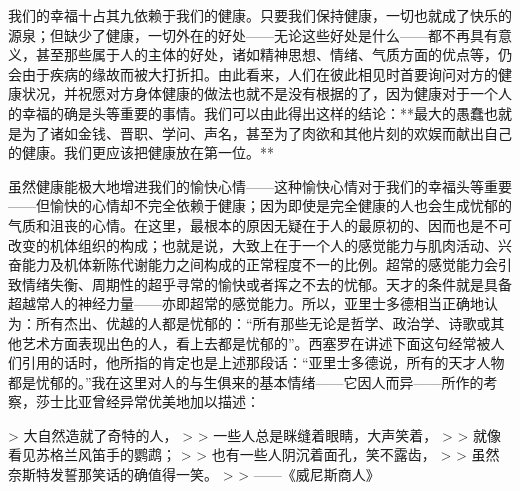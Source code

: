 \documentclass[12pt,oneside]{book}
\begin{document}
我们的幸福十占其九依赖于我们的健康。只要我们保持健康，一切也就成了快乐的源泉；但缺少了健康，一切外在的好处——无论这些好处是什么——都不再具有意义，甚至那些属于人的主体的好处，诸如精神思想、情绪、气质方面的优点等，仍会由于疾病的缘故而被大打折扣。由此看来，人们在彼此相见时首要询问对方的健康状况，并祝愿对方身体健康的做法也就不是没有根据的了，因为健康对于一个人的幸福的确是头等重要的事情。我们可以由此得出这样的结论：**最大的愚蠢也就是为了诸如金钱、晋职、学问、声名，甚至为了肉欲和其他片刻的欢娱而献出自己的健康。我们更应该把健康放在第一位。** 

虽然健康能极大地增进我们的愉快心情——这种愉快心情对于我们的幸福头等重要——但愉快的心情却不完全依赖于健康；因为即使是完全健康的人也会生成忧郁的气质和沮丧的心情。在这里，最根本的原因无疑在于人的最原初的、因而也是不可改变的机体组织的构成；也就是说，大致上在于一个人的感觉能力与肌肉活动、兴奋能力及机体新陈代谢能力之间构成的正常程度不一的比例。超常的感觉能力会引致情绪失衡、周期性的超乎寻常的愉快或者挥之不去的忧郁。天才的条件就是具备超越常人的神经力量——亦即超常的感觉能力。所以，亚里士多德相当正确地认为：所有杰出、优越的人都是忧郁的：“所有那些无论是哲学、政治学、诗歌或其他艺术方面表现出色的人，看上去都是忧郁的”。西塞罗在讲述下面这句经常被人们引用的话时，他所指的肯定也是上述那段话：“亚里士多德说，所有的天才人物都是忧郁的。”我在这里对人的与生俱来的基本情绪——它因人而异——所作的考察，莎士比亚曾经异常优美地加以描述： 

 

> 大自然造就了奇特的人，
>
> 一些人总是眯缝着眼睛，大声笑着， 
>
> 就像看见苏格兰风笛手的鹦鹉； 
>
> 也有一些人阴沉着面孔，笑不露齿， 
>
> 虽然奈斯特发誓那笑话的确值得一笑。 
>
> ——《威尼斯商人》 

 
\end{document}
